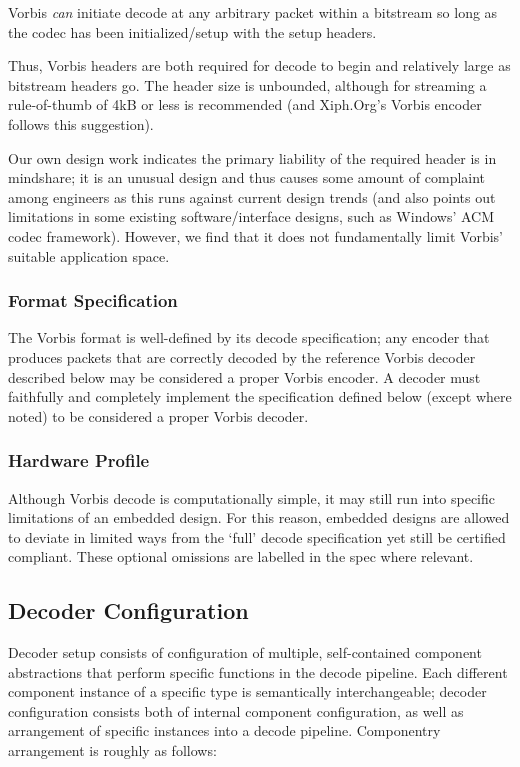\begin{note}
Vorbis \emph{can} initiate decode at any arbitrary packet within a
bitstream so long as the codec has been initialized/setup with the
setup headers.
\end{note}

Thus, Vorbis headers are both required for decode to begin and
relatively large as bitstream headers go.  The header size is
unbounded, although for streaming a rule-of-thumb of 4kB or less is
recommended (and Xiph.Org's Vorbis encoder follows this suggestion).

Our own design work indicates the primary liability of the
required header is in mindshare; it is an unusual design and thus
causes some amount of complaint among engineers as this runs against
current design trends (and also points out limitations in some
existing software/interface designs, such as Windows' ACM codec
framework).  However, we find that it does not fundamentally limit
Vorbis' suitable application space.


\subsubsection{Format Specification}
The Vorbis format is well-defined by its decode specification; any
encoder that produces packets that are correctly decoded by the
reference Vorbis decoder described below may be considered a proper
Vorbis encoder.  A decoder must faithfully and completely implement
the specification defined below (except where noted) to be considered
a proper Vorbis decoder.

\subsubsection{Hardware Profile}
Although Vorbis decode is computationally simple, it may still run
into specific limitations of an embedded design.  For this reason,
embedded designs are allowed to deviate in limited ways from the
`full' decode specification yet still be certified compliant.  These
optional omissions are labelled in the spec where relevant.


\subsection{Decoder Configuration}

Decoder setup consists of configuration of multiple, self-contained
component abstractions that perform specific functions in the decode
pipeline.  Each different component instance of a specific type is
semantically interchangeable; decoder configuration consists both of
internal component configuration, as well as arrangement of specific
instances into a decode pipeline.  Componentry arrangement is roughly
as follows:

